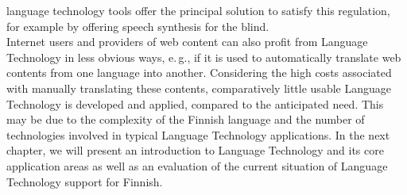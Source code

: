 \begin{multicols}{2}
language technology tools offer the principal solution to satisfy this
regulation, for example by offering speech synthesis for the blind.\\
Internet users and providers of web content can also profit from
Language Technology in less obvious ways, e.\,g., if it is used to
automatically translate web contents from one language into
another. Considering the high costs associated with manually
translating these contents, comparatively little usable Language
Technology is developed and applied, compared to the anticipated
need. This may be due to the complexity of the Finnish language and
the number of technologies involved in typical Language Technology
applications. In the next chapter, we will present an introduction to
Language Technology and its core application areas as well as an
evaluation of the current situation of Language Technology support for
Finnish.

\end{multicols}
\clearpage
{}
